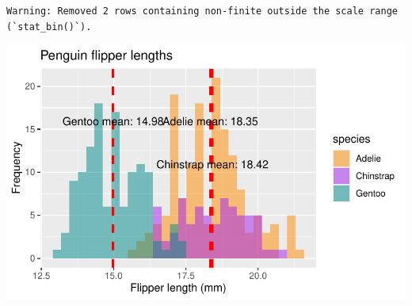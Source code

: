 \documentclass[
  letterpaper,
  DIV=11,
  numbers=noendperiod]{scrreprt}
\begin{document}
\begin{verbatim}
Warning: Removed 2 rows containing non-finite outside the scale range
(`stat_bin()`).
\end{verbatim}

\includegraphics{scripts/02_dataViz/class4_files/figure-pdf/unnamed-chunk-10-1.pdf}
\end{document}
